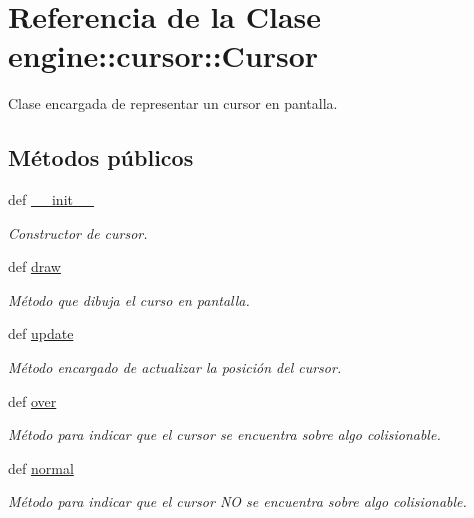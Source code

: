\hypertarget{classengine_1_1cursor_1_1Cursor}{
\section{\-Referencia de la \-Clase engine\-:\-:cursor\-:\-:\-Cursor}
\label{classengine_1_1cursor_1_1Cursor}
}


\-Clase encargada de representar un cursor en pantalla.  


\subsection*{\-Métodos públicos}
\begin{DoxyCompactItemize}
\item 
def \hyperlink{classengine_1_1cursor_1_1Cursor_a1f677ecbf950379c9f247f52ff318f24}{\-\_\-\-\_\-init\-\_\-\-\_\-}
\begin{DoxyCompactList}\small\item\em \-Constructor de cursor. \end{DoxyCompactList}\item 
def \hyperlink{classengine_1_1cursor_1_1Cursor_a4fa10b80a179c6b40e6c1967f9a6505c}{draw}
\begin{DoxyCompactList}\small\item\em \-Método que dibuja el curso en pantalla. \end{DoxyCompactList}\item 
\hypertarget{classengine_1_1cursor_1_1Cursor_aebb50ddddeb90f43242691f5823dd849}{
def \hyperlink{classengine_1_1cursor_1_1Cursor_aebb50ddddeb90f43242691f5823dd849}{update}}
\label{classengine_1_1cursor_1_1Cursor_aebb50ddddeb90f43242691f5823dd849}

\begin{DoxyCompactList}\small\item\em \-Método encargado de actualizar la posición del cursor. \end{DoxyCompactList}\item 
\hypertarget{classengine_1_1cursor_1_1Cursor_ab98394a877f21f28863a54d1dfb6fa30}{
def \hyperlink{classengine_1_1cursor_1_1Cursor_ab98394a877f21f28863a54d1dfb6fa30}{over}}
\label{classengine_1_1cursor_1_1Cursor_ab98394a877f21f28863a54d1dfb6fa30}

\begin{DoxyCompactList}\small\item\em \-Método para indicar que el cursor se encuentra sobre algo colisionable. \end{DoxyCompactList}\item 
\hypertarget{classengine_1_1cursor_1_1Cursor_acbc91b1e43d974bd19938eda034d52f0}{
def \hyperlink{classengine_1_1cursor_1_1Cursor_acbc91b1e43d974bd19938eda034d52f0}{normal}}
\label{classengine_1_1cursor_1_1Cursor_acbc91b1e43d974bd19938eda034d52f0}

\begin{DoxyCompactList}\small\item\em \-Método para indicar que el cursor \-N\-O se encuentra sobre algo colisionable. \end{DoxyCompactList}\end{DoxyCompactItemize}
